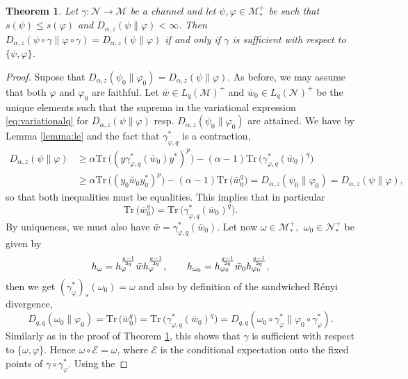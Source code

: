 \documentclass[12pt]{article}
\newtheorem{theorem}{Theorem}[section]
\theoremstyle{definition}
\theoremstyle{remark}
\numberwithin{equation}{section}
\def\cE{\mathcal E}
\def\Me{\mathcal M}
\def\Ne{\mathcal N}
\def \Tr{\mathrm{Tr}\,}
\def\ffi{\varphi}
\begin{document}
\begin{theorem}\label{thm:suffge1} Let $\gamma:\Ne\to \Me$ be a channel and let $\psi,\varphi\in \Me_*^+$ be
such that 
$s(\psi)\le s(\ffi)$ and 
$D_{\alpha,z}(\psi\|\varphi)<\infty$. Then
$D_{\alpha,z}(\psi\circ\gamma\|\ffi\circ\gamma)=D_{\alpha,z}(\psi\|\varphi)$ if and only if
$\gamma$ is sufficient with respect to $\{\psi,\ffi\}$.

\end{theorem}

\begin{proof} Supose that $D_{\alpha,z}(\psi_0\|\varphi_0)=D_{\alpha,z}(\psi\|\varphi)$.
As before, we may assume that both $\varphi$ and $\varphi_0$ are
faithful.  Let $\bar
w\in L_q(\Me)^+$ and $\bar w_0\in L_q(\Ne)^+$ be the unique elements such that the suprema
in the variational expression \eqref{eq:variationalq} for $D_{\alpha,z}(\psi\|\varphi)$ resp.
$D_{\alpha,z}(\psi_0\|\varphi_0)$ are attained. We have by Lemma \ref{lemma:le} and the
fact that $\gamma^*_{\ffi,q}$ is a contraction,
\begin{align*}
D_{\alpha,z}(\psi\|\varphi)&\ge \alpha\Tr\bigl((y\gamma^*_{\varphi,q}(\bar
w_0)y^*)^p\bigr)-(\alpha-1)\Tr
\bigl(\gamma^*_{\varphi,q}(\bar w_0)^q\bigr)\\
&\ge \alpha\Tr\bigr((y_0\bar w_0 y_0^*)^p\bigr)-(\alpha-1)\Tr \bigl(\bar
w_0^q\bigr)=D_{\alpha,z}(\psi_0\|\varphi_0)=D_{\alpha,z}(\psi\|\varphi),
\end{align*}
so that both inequalities must be equalities. This implies that in particular
\[
\Tr \bigl(\bar w_0^q\bigr)=\Tr \bigl(\gamma^*_{\varphi,q}(\bar w_0)^q\bigr).
\]
By uniqueness, we must also have  $\bar w=\gamma^*_{\varphi,q}(\bar w_0)$. Let now
$\omega\in \Me_*^+$, $\
\omega_0\in \Ne_*^+$ be given by
\begin{equation}\label{eq:omega}
h_{\omega}=h_\varphi^{q-1\over 2q}\bar wh_\varphi^{q-1\over 2q},\qquad 
h_{\omega_0}=h_{\varphi_0}^{q-1\over 2q}\bar w_0h_{\varphi_0}^{q-1\over 2q},
\end{equation}
then 
we get  $(\gamma^*_\varphi)_*(\omega_0)=\omega$ and also by
definition of the sandwiched R\'enyi divergence,
\[
D_{q,q}(\omega_0\|\varphi_0)=\Tr \bigl(\bar w_0^q\bigr)=\Tr \bigl(\gamma^*_{\varphi,q}(\bar
w_0)^q\bigr)=D_{q,q}(\omega_0\circ\gamma^*_\ffi\|\varphi_0\circ\gamma^*_\ffi).
\]
Similarly as in the proof of Theorem \ref{thm:suffge1}, this shows that $\gamma$ is sufficient with
respect to $\{\omega,\ffi\}$. Hence $\omega\circ \cE=\omega$, where $\cE$ is the
conditional expectation onto the fixed points of $\gamma\circ\gamma^*_\ffi$.  Using the

\end{proof}
\end{document}
